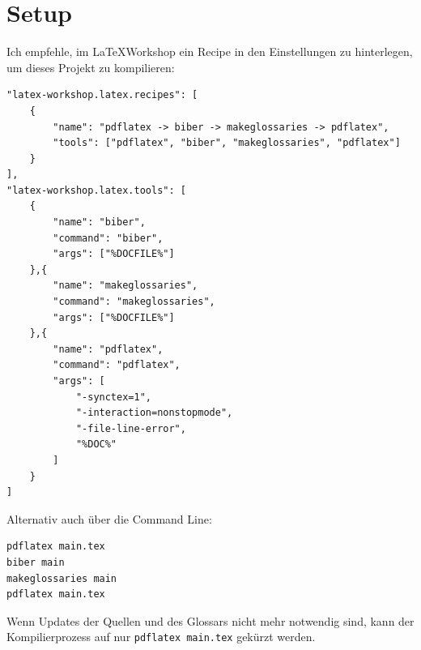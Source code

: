 \chapter{Setup}
\label{cha:setup}

Ich empfehle, im \LaTeX Workshop ein Recipe in den Einstellungen zu hinterlegen, um dieses Projekt zu kompilieren:

\begin{lstlisting}[caption=Einstellungen für ein Recipe des LaTeX Workshops]
"latex-workshop.latex.recipes": [
    {
        "name": "pdflatex -> biber -> makeglossaries -> pdflatex",
        "tools": ["pdflatex", "biber", "makeglossaries", "pdflatex"]
    }
],
"latex-workshop.latex.tools": [
    {
        "name": "biber",
        "command": "biber",
        "args": ["%DOCFILE%"]
    },{
        "name": "makeglossaries",
        "command": "makeglossaries",
        "args": ["%DOCFILE%"]
    },{
        "name": "pdflatex",
        "command": "pdflatex",
        "args": [
            "-synctex=1",
            "-interaction=nonstopmode",
            "-file-line-error",
            "%DOC%"
        ]
    }
]
\end{lstlisting}

Alternativ auch über die Command Line:

\begin{lstlisting}[caption=Manueller Ablauf des Kompilierens]
pdflatex main.tex
biber main
makeglossaries main
pdflatex main.tex
\end{lstlisting}

Wenn Updates der Quellen und des Glossars nicht mehr notwendig sind, kann der Kompilierprozess auf nur \lstinline|pdflatex main.tex| gekürzt werden.